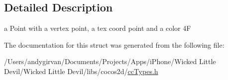 \subsection{Detailed Description}
a Point with a vertex point, a tex coord point and a color 4\-F 

The documentation for this struct was generated from the following file\-:\begin{DoxyCompactItemize}
\item 
/\-Users/andygirvan/\-Documents/\-Projects/\-Apps/i\-Phone/\-Wicked Little Devil/\-Wicked Little Devil/libs/cocos2d/\hyperlink{cc_types_8h}{cc\-Types.\-h}\end{DoxyCompactItemize}
